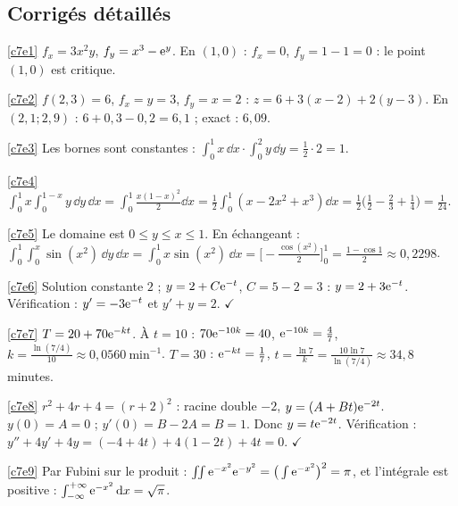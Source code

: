 \subsection{Corrigés détaillés}
\begin{corrige}{\ref{c7e1}}
$f_x=3x^2y$, $f_y=x^3-\mathrm{e}^y$. En $(1,0)$ : $f_x=0$, $f_y=1-1=0$ : le point $(1,0)$ est critique.
\end{corrige}
\begin{corrige}{\ref{c7e2}}
$f(2,3)=6$, $f_x=y=3$, $f_y=x=2$ : $z=6+3(x-2)+2(y-3)$. En $(2{,}1;2{,}9)$ : $6+0{,}3-0{,}2=6{,}1$ ; exact : $6{,}09$.
\end{corrige}
\begin{corrige}{\ref{c7e3}}
Les bornes sont constantes : $\int_0^1x\,\dd x\cdot\int_0^2y\,\dd y=\frac12\cdot2=1$.
\end{corrige}
\begin{corrige}{\ref{c7e4}}
$\int_0^1x\int_0^{1-x}y\,\dd y\,\dd x=\int_0^1\frac{x(1-x)^2}2\dd x=\frac12\int_0^1(x-2x^2+x^3)\dd x=\frac12\big(\frac12-\frac23+\frac14\big)=\frac1{24}$.
\end{corrige}
\begin{corrige}{\ref{c7e5}}
Le domaine est $0\le y\le x\le1$. En échangeant : $\int_0^1\int_0^x\sin(x^2)\,\dd y\,\dd x=\int_0^1x\sin(x^2)\,\dd x=\big[-\frac{\cos(x^2)}2\big]_0^1=\frac{1-\cos1}2\approx0{,}2298$.
\end{corrige}
\begin{corrige}{\ref{c7e6}}
Solution constante $2$ ; $y=2+C\mathrm{e}^{-t}$, $C=5-2=3$ : $y=2+3\mathrm{e}^{-t}$. Vérification : $y'=-3\mathrm{e}^{-t}$ et $y'+y=2$. $\checkmark$
\end{corrige}
\begin{corrige}{\ref{c7e7}}
$T=20+70\mathrm{e}^{-kt}$. À $t=10$ : $70\mathrm{e}^{-10k}=40$, $\mathrm{e}^{-10k}=\frac47$, $k=\frac{\ln(7/4)}{10}\approx0{,}0560\ \mathrm{min}^{-1}$. $T=30$ : $\mathrm{e}^{-kt}=\frac17$, $t=\frac{\ln7}k=\frac{10\ln7}{\ln(7/4)}\approx34{,}8$ minutes.
\end{corrige}
\begin{corrige}{\ref{c7e8}}
$r^2+4r+4=(r+2)^2$ : racine double $-2$, $y=(A+Bt)\mathrm{e}^{-2t}$. $y(0)=A=0$ ; $y'(0)=B-2A=B=1$. Donc $y=t\mathrm{e}^{-2t}$. Vérification : $y''+4y'+4y=(-4+4t)+4(1-2t)+4t=0$. $\checkmark$
\end{corrige}
\begin{corrige}{\ref{c7e9}}
Par Fubini sur le produit : $\iint\mathrm{e}^{-x^2}\mathrm{e}^{-y^2}=\big(\int\mathrm{e}^{-x^2}\big)^2=\pi$, et l'intégrale est positive : $\int_{-\infty}^{+\infty}\mathrm{e}^{-x^2}\,\mathrm{d} x=\sqrt\pi$.
\end{corrige}
\else{}\fi

